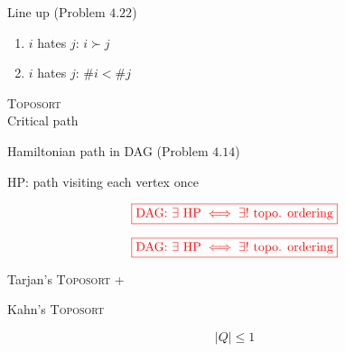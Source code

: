 \begin{frame}{}
  \begin{exampleblock}{Line up (Problem $4.22$)}
    \begin{enumerate}
      \item $i$ hates $j$: $i \succ j$
      \item $i$ hates $j$: $\# i < \# j$
    \end{enumerate}
  \end{exampleblock}

  \vspace{0.50cm}
  \begin{center}
    \textsc{Toposort} \\[8pt]

    Critical path
  \end{center}
\end{frame}
\begin{frame}{}
  \begin{exampleblock}{Hamiltonian path in DAG (Problem $4.14$)}
    \begin{center}
      HP: path visiting each vertex once \\[8pt]

    \end{center}
  \end{exampleblock}

  \pause
  \vspace{0.60cm}
  \centerline{}

  \pause
  \vspace{0.50cm}

  \pause
  \[
    \textcolor{red}{\boxed{\text{DAG: } \exists \text{ HP} \iff \exists! \text{ topo. ordering}}}
  \]
\end{frame}
\begin{frame}{}
  \[
    \textcolor{red}{\boxed{\text{DAG: } \exists \text{ HP} \iff \exists! \text{ topo. ordering}}}
  \]

  \pause
  \vspace{0.60cm}
  \centerline{Tarjan's \textsc{Toposort} + }

  \pause

  \pause
  \vspace{0.30cm}
  \centerline{Kahn's \textsc{Toposort} }
  \pause
  \[
    |Q| \le 1
  \]
\end{frame}
